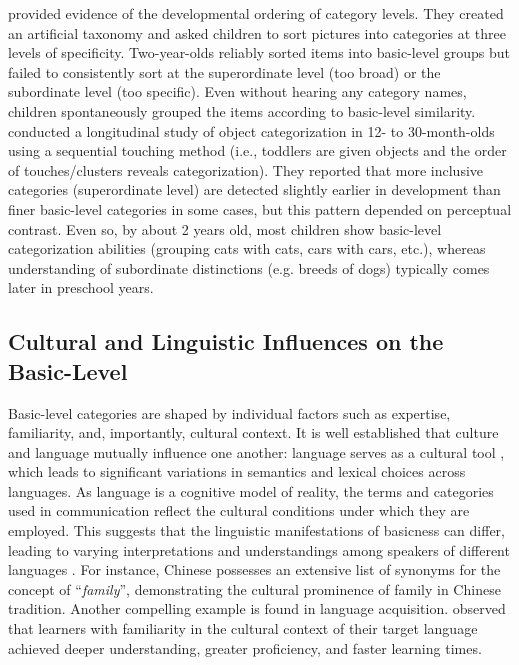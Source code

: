 \documentclass[preprint,12pt,authoryear]{elsarticle}
\begin{document}
\citet{mervis_order_1982} provided evidence of the developmental ordering of category levels. They created an artificial taxonomy and asked children to sort pictures into categories at three levels of specificity. Two-year-olds reliably sorted items into basic-level groups but failed to consistently sort at the superordinate level (too broad) or the subordinate level (too specific). Even without hearing any category names, children spontaneously grouped the items according to basic-level similarity. \citet{bornstein_development_2010} conducted a longitudinal study of object categorization in 12- to 30-month-olds using a sequential touching method (i.e., toddlers are given objects and the order of touches/clusters reveals categorization). They reported that more inclusive categories (superordinate level) are detected slightly earlier in development than finer basic-level categories in some cases, but this pattern depended on perceptual contrast. Even so, by about 2 years old, most children show basic-level categorization abilities (grouping cats with cats, cars with cars, etc.), whereas understanding of subordinate distinctions (e.g. breeds of dogs) typically comes later in preschool years.

\subsection{Cultural and Linguistic Influences on the Basic-Level}

Basic-level categories are shaped by individual factors such as expertise, familiarity, and, importantly, cultural context. It is well established that culture and language mutually influence one another: language serves as a cultural tool \cite{everett_language_2012}, which leads to significant variations in semantics and lexical choices across languages. As language is a cognitive model of reality, the terms and categories used in communication reflect the cultural conditions under which they are employed. This suggests that the linguistic manifestations of basicness can differ, leading to varying interpretations and understandings among speakers of different languages \cite{mauri_linguistic_2018}. For instance, Chinese possesses an extensive list of synonyms for the concept of ``\textit{family}'', demonstrating the cultural prominence of family in Chinese tradition. Another compelling example is found in language acquisition. \citet{fulcher_language_2006} observed that learners with familiarity in the cultural context of their target language achieved deeper understanding, greater proficiency, and faster learning times.
\end{document}
